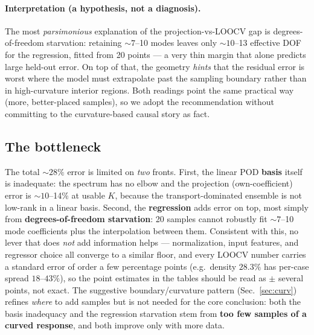 \documentclass[11pt]{article}
\begin{document}
\paragraph{Interpretation (a hypothesis, not a diagnosis).} The most
\emph{parsimonious} explanation of the projection-vs-LOOCV gap is
degrees-of-freedom starvation: retaining ${\sim}7$--10 modes leaves only
${\sim}10$--13 effective DOF for the regression, fitted from 20 points ---
a very thin margin that alone predicts large held-out error. On top of
that, the geometry \emph{hints} that the residual error is worst where the
model must extrapolate past the sampling boundary rather than in
high-curvature interior regions. Both readings point the same practical
way (more, better-placed samples), so we adopt the recommendation without
committing to the curvature-based causal story as fact.

\subsection{The bottleneck}
The total ${\sim}28\%$ error is limited on \emph{two} fronts. First, the
linear POD \textbf{basis} itself is inadequate: the spectrum has no elbow
and the projection (own-coefficient) error is ${\sim}10$--14\% at usable
$K$, because the transport-dominated ensemble is not low-rank in a linear
basis. Second, the \textbf{regression} adds error on top, most simply from
\textbf{degrees-of-freedom starvation}: 20 samples cannot robustly fit
${\sim}7$--10 mode coefficients plus the interpolation between them.
Consistent with this, no lever that does \emph{not} add information
helps --- normalization, input features, and regressor choice all converge
to a similar floor, and every LOOCV number carries a standard error of
order a few percentage points (e.g.\ density $28.3\%$ has per-case spread
$18$--$43\%$), so the point estimates in the tables should be read as
${\pm}$ several points, not exact. The suggestive boundary/curvature
pattern (Sec.~\ref{sec:curv}) refines \emph{where} to add samples but is
not needed for the core conclusion: both the basis inadequacy and the
regression starvation stem from \textbf{too few samples of a curved
response}, and both improve only with more data.

\end{document}
